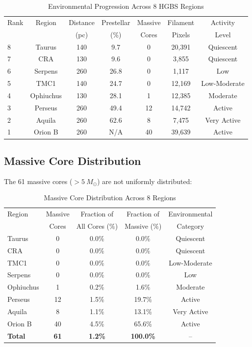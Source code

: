 \documentclass[11pt,a4paper]{article}
\begin{document}
\begin{table}[H]
\centering
\caption{Environmental Progression Across 8 HGBS Regions}
\begin{tabular}{lcccccc}
\toprule
Rank & Region & Distance & Prestellar & Massive & Filament & Activity \\
     &        & (pc)    & (\%)    & Cores  & Pixels & Level \\
\midrule
8 & Taurus  & 140 & 9.7 & 0 & 20,391   & Quiescent \\
7 & CRA     & 130 & 9.6 & 0 & 3,855    & Quiescent \\
6 & Serpens & 260 & 26.8 & 0 & 1,117    & Low \\
5 & TMC1    & 140 & 24.7 & 0 & 12,169   & Low-Moderate \\
4 & Ophiuchus& 130 & 28.1 & 1 & 12,385   & Moderate \\
3 & Perseus & 260 & 49.4 & 12 & 14,742   & Active \\
2 & Aquila  & 260 & 62.6 & 8 & 7,475    & Very Active \\
1 & Orion B & 260 & N/A & 40 & 39,639   & Active \\
\bottomrule
\end{tabular}
\end{table}

\subsection{Massive Core Distribution}

The 61 massive cores ($>5~M_\odot$) are not uniformly distributed:

\begin{table}[H]
\centering
\caption{Massive Core Distribution Across 8 Regions}
\begin{tabular}{lcccc}
\toprule
Region & Massive & Fraction of & Fraction of & Environmental \\
      & Cores & All Cores (\%) & Massive (\%) & Category \\
\midrule
Taurus   & 0     & 0.0\%   & 0.0\%   & Quiescent \\
CRA      & 0     & 0.0\%   & 0.0\%   & Quiescent \\
TMC1     & 0     & 0.0\%   & 0.0\%   & Low-Moderate \\
Serpens  & 0     & 0.0\%   & 0.0\%   & Low \\
Ophiuchus& 1     & 0.2\%   & 1.6\%   & Moderate \\
Perseus  & 12    & 1.5\%   & 19.7\%  & Active \\
Aquila   & 8     & 1.1\%   & 13.1\%  & Very Active \\
Orion B  & 40     & 4.5\%   & 65.6\%  & Active \\
\midrule
\textbf{Total} & \textbf{61}  & \textbf{1.2\%}  & \textbf{100.0\%}  & -- \\
\bottomrule
\end{tabular}
\end{table}
\end{document}
